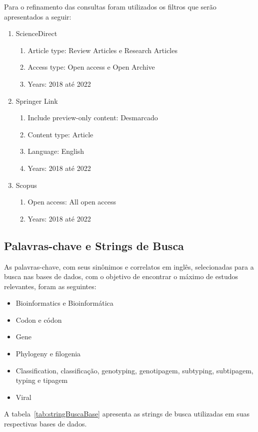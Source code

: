 \documentclass[12pt]{article}
\begin{document}
Para o refinamento das consultas foram utilizados os filtros que serão apresentados a seguir:

\begin{enumerate}
    \item ScienceDirect
          \begin{enumerate}
              \item Article type: Review Articles e Research Articles
              \item Access type: Open access e Open Archive
              \item Years: 2018 até 2022
          \end{enumerate}
    \item Springer Link
          \begin{enumerate}
              \item Include preview-only content: Desmarcado
              \item Content type: Article
              \item Language: English
              \item Years: 2018 até 2022
          \end{enumerate}
    \item Scopus
          \begin{enumerate}
              \item Open access: All open access
              \item Years: 2018 até 2022
          \end{enumerate}
\end{enumerate}


\subsection{Palavras-chave e Strings de Busca}

As palavras-chave, com seus sinônimos e correlatos em inglês, selecionadas para a busca nas bases de dados, com o objetivo de encontrar o máximo de estudos relevantes, foram as seguintes:
\begin{itemize}
    \item{Bioinformatics e Bioinformática}
    \item{Codon e códon}
    \item{Gene}
    \item{Phylogeny e filogenia}
    \item{Classification, classificação, genotyping, genotipagem, subtyping, subtipagem, typing e tipagem}
    \item{Viral}
\end{itemize}
A tabela~\ref{tab:stringBuscaBase} apresenta as strings de busca utilizadas em suas respectivas bases de dados.
\end{document}
